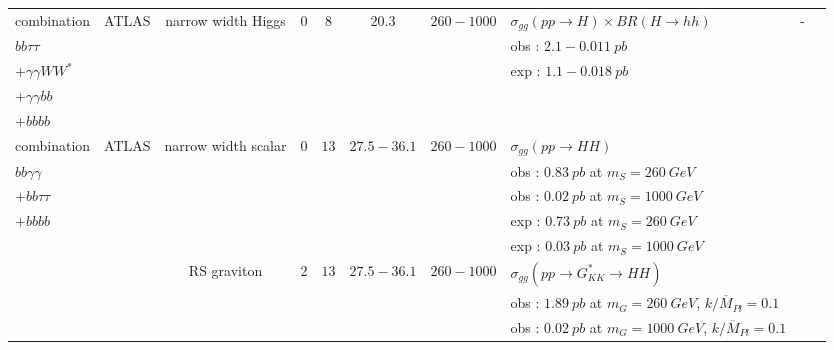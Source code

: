 \begin{table}[h!]
{\begin{tabular}{|l|l|c|c|c|c|c|l|c|c|}
\hline
combination                &ATLAS        &narrow width Higgs        &0    &$8$        &$20.3$        &$260-1000$        &$\sigma_{gg}(pp\rightarrow H)\times BR(H\rightarrow hh)$                 &-    &\cite{Aad:2015xja}\\
$bb \tau\tau$                &        &                &    &        &        &            &obs : $2.1-0.011\ pb$                                    &    &\\
+$\gamma\gamma WW^*$            &        &                &    &        &        &            &exp : $1.1-0.018\ pb$                                    &    &\\
+$\gamma\gamma bb$            &        &                &    &        &        &            &    & &\\
+$bb bb$                &        &                &    &        &        &            &    & &\\
\hline
combination                &ATLAS        &narrow width scalar        &0    &$13$        &$27.5-36.1$    &$260-1000$        &$\sigma_{gg}(pp\rightarrow HH)$                            &    &\cite{ATLAS:2018otd}\\
$bb \gamma\gamma$            &        &                &    &        &        &            &obs : $0.83\ pb$ at $m_S=260\ GeV$                            &    &\\
$+bb \tau\tau$                &        &                &    &        &        &            &obs : $0.02\ pb$ at $m_S=1000\ GeV$                            &    &\\
$+bb bb$                &        &                &    &        &        &            &exp : $0.73\ pb$ at $m_S=260\ GeV$                            &    &\\
                    &        &                &    &        &        &            &exp : $0.03\ pb$ at $m_S=1000\ GeV$                            &    &\\
\cline{3-10}
                    &        &RS graviton            &2    &$13$        &$27.5-36.1$    &$260-1000$        &$\sigma_{gg}(pp\rightarrow G_{KK}^*\rightarrow HH)$                    &    &\cite{ATLAS:2018otd}\\
                    &        &                &    &        &        &            &obs : $1.89\ pb$ at $m_G=260\ GeV$, $k/\overline{M}_{Pl}=0.1$                &    &\\
                    &        &                &    &        &        &            &obs : $0.02\ pb$ at $m_G=1000\ GeV$, $k/\overline{M}_{Pl}=0.1$                &    &\\

\end{tabular}}
\end{table}
